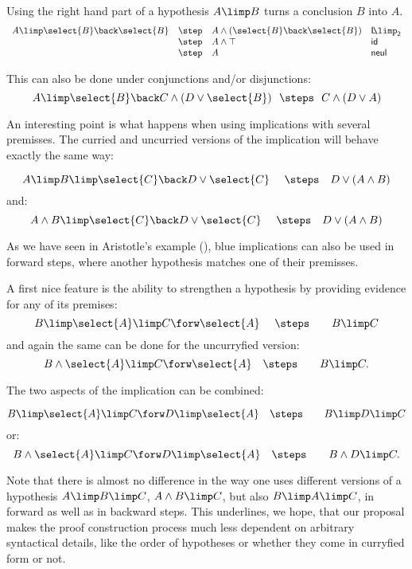 Using the right hand part of a hypothesis $A\limp B$ turns a 
conclusion $B$ into $A$. 
$$
\begin{array}{llll}
  A\limp \select{B} \back \select{B} &\step& A\land (\select{B}
                                                \back
                                                \select{B})&\mathsf{L
                                                             \!\!\limp_2}\\
                                         &\step&A\land\top & \mathsf{id}\\
    &\step& A&\mathsf{neul}
\end{array}
$$

This can also be done under conjunctions and/or disjunctions:
$$
  A\limp \select{B} \back C \land (D\lor \select{B}) ~~ \steps ~~ C \land (D\lor A)
$$

An interesting point is what happens when using implications with
several premisses. The curried and uncurried versions of the
implication will behave exactly the same way:

$$
  A\limp B \limp \select{C} \back D\lor \select{C}
  ~~~\/ ~\steps~~~  D\lor (A\land B)
$$
and:
$$
  A\land B \limp \select{C} \back D\lor \select{C}
  ~~~ \/ ~\steps~~~  D\lor (A\land B)
$$


As we have seen in Aristotle's example (), blue
implications can also be used in forward steps, where another
hypothesis matches one of their premisses.

A first nice feature is the ability to strengthen a hypothesis by
providing evidence for any of its premises:
$$
B\limp \select{A}\limp C \forw \select {A}  ~~\/~\/~\steps~\/~~~~~
B\limp C$$
and again the same can be done for the uncurryfied version:
$$
B\land \select{A}\limp C \forw \select {A}  ~\/~\/~\steps~\/~~~~~
B\limp C.$$

The two aspects of the implication can be combined:

$$
B\limp \select{A}\limp C \forw D\limp\select {A}  ~\/~\/~\steps~\/~~~~~
B\limp D\limp C$$
or:
$$
B\land \select{A}\limp C \forw D\limp\select {A}  ~\/~\/~\steps~\/~~~~~
B\land D \limp C.$$


Note that there is almost no difference in the way one uses different
versions of a hypothesis $A\limp B\limp C$, $A\land B\limp
C$, but also $B\limp A\limp C$, in forward as well as in
backward steps. This underlines, we hope, that our
proposal makes the proof construction process much less dependent on
arbitrary syntactical details, like the order of hypotheses or whether
they come in curryfied form or not.

